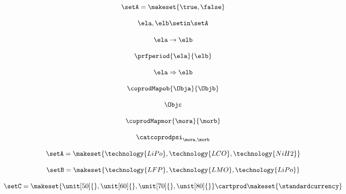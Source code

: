 \begin{forslides}
    \begin{equation}
        \label{eq:systems-080}
        \setA = \makeset{ \true, \false }
    \end{equation}

    \begin{equation}
        \label{eq:systems-081}
        \ela, \elb \setin \setA
    \end{equation}

    \begin{equation}
        \label{eq:systems-082}
        \ela \to \elb
    \end{equation}

    \begin{equation}
        \label{eq:systems-083}
        \prfperiod{\ela}{\elb}
    \end{equation}

    \begin{equation}
        \label{eq:systems-084}
        \ela \Rightarrow \elb
    \end{equation}

    \begin{equation}
        \label{eq:systems-085}
        \coprodMapob{\Obja}{\Objb}
    \end{equation}

    \begin{equation}
        \label{eq:systems-086}
        \Objc
    \end{equation}

    \begin{equation}
        \label{eq:systems-087}
        \coprodMapmor{\mora}{\morb}
    \end{equation}

    \begin{equation}
        \label{eq:systems-088}
        \catcoprodpsi_{\mora, \morb}
    \end{equation}

    \begin{equation}
        \label{eq:systems-089}
        \setA=\makeset{\technology{LiPo}, \technology{LCO},\technology{NiH2}}
    \end{equation}

    \begin{equation}
        \label{eq:systems-090}
        \setB=\makeset{\technology{LFP},\technology{LMO},\technology{LiPo}}
    \end{equation}

    \begin{equation}
        \label{eq:systems-091}
        \setC=\makeset{\unit[50]{},\unit[60]{},\unit[70]{},\unit[80]{}}\cartprod \makeset{\text{\standardcurrency}}
    \end{equation}


\end{forslides}
